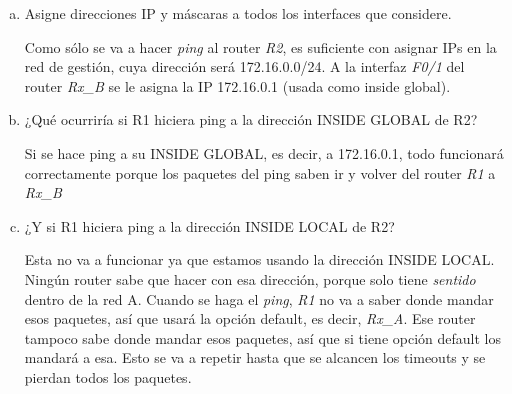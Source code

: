 \documentclass[12pt]{article}
\theoremstyle{definition}
\theoremstyle{remark}
\begin{document}
\begin{enumerate}[(a)]
\item Asigne direcciones IP y máscaras a todos los interfaces que considere.

Como sólo se va a hacer \textit{ping} al router \textit{R2}, es suficiente con asignar IPs en la red de gestión, cuya dirección será 172.16.0.0/24. A la interfaz \textit{F0/1} del router \textit{Rx\_B} se le asigna la IP 172.16.0.1 (usada como inside global).

\item ¿Qué ocurriría si R1 hiciera ping a la dirección INSIDE GLOBAL de R2?

Si se hace ping a su INSIDE GLOBAL, es decir, a 172.16.0.1, todo funcionará correctamente porque los paquetes del  ping saben ir y volver del router \textit{R1} a \textit{Rx\_B}

\item ¿Y si R1 hiciera ping a la dirección INSIDE LOCAL de R2?

Esta no va a funcionar ya que estamos usando la dirección INSIDE LOCAL. Ningún router sabe que hacer con esa dirección, porque solo tiene \textit{sentido} dentro de la red A. Cuando se haga el \textit{ping}, \textit{R1} no va a saber donde mandar esos paquetes, así que usará la opción default, es decir, \textit{Rx\_A}. Ese router tampoco sabe donde mandar esos paquetes, así que si tiene opción default los mandará a esa. Esto se va a repetir hasta que se alcancen los timeouts y se pierdan todos los paquetes.
\end{enumerate}
\end{document}
